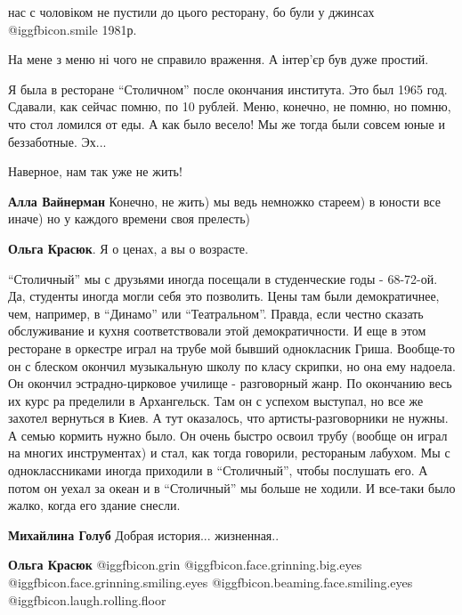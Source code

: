 \begin{itemize}

нас с чоловіком не пустили до цього ресторану, бо були у джинсах  @igg{fbicon.smile}  1981р.


На мене з меню ні чого не справило враження. А інтер'єр був дуже простий.

Я была в ресторане \enquote{Столичном} после окончания института.
Это был 1965 год.
Сдавали, как сейчас помню, по 10 рублей.
Меню, конечно, не помню, но помню, что стол ломился от еды.
А как было весело!
Мы же тогда были совсем юные и беззаботные. Эх...

Наверное, нам так уже не жить!

\begin{itemize} %
\textbf{Алла Вайнерман} Конечно, не жить) мы ведь немножко стареем) в юности все иначе) но у каждого времени своя прелесть)

\textbf{Ольга Красюк}. Я о ценах, а вы о возрасте.
\end{itemize} %


\enquote{Столичный} мы с друзьями иногда посещали в студенческие годы - 68-72-ой. Да,
студенты иногда могли себя это позволить. Цены там были демократичнее, чем,
например, в \enquote{Динамо} или \enquote{Театральном}. Правда, если честно сказать
обслуживание и кухня соответствовали этой демократичности. И еще в этом
ресторане в оркестре играл на трубе мой бывший однокласник Гриша. Вообще-то он
с блеском окончил музыкальную школу по класу скрипки, но она ему надоела. Он
окончил эстрадно-цирковое училище - разговорный жанр. По окончанию весь их курс
ра пределили в Архангельск. Там он с успехом выступал, но все же захотел
вернуться в Киев. А тут оказалось, что артисты-разговорники не нужны. А семью
кормить нужно было. Он очень быстро освоил трубу (вообще он играл на многих
инструментах) и стал, как тогда говорили, рестораным лабухом. Мы с
одноклассниками иногда приходили в \enquote{Столичный}, чтобы послушать его. А потом он
уехал за океан и в \enquote{Столичный} мы больше не ходили. И все-таки было жалко,
когда его здание снесли.

\begin{itemize} %
\textbf{Михайлина Голуб} Добрая история... жизненная..

\textbf{Ольга Красюк}  @igg{fbicon.grin}  @igg{fbicon.face.grinning.big.eyes}  @igg{fbicon.face.grinning.smiling.eyes}  @igg{fbicon.beaming.face.smiling.eyes}  @igg{fbicon.laugh.rolling.floor} 
\end{itemize} %


\end{itemize}
